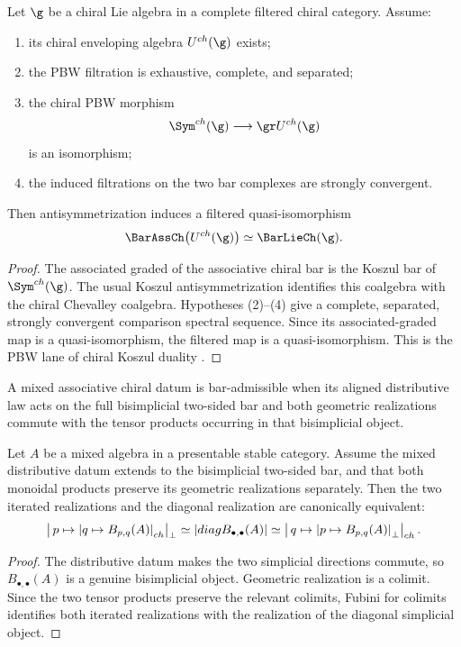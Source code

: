 \begin{theorem}
Let $\g$ be a chiral Lie algebra in a complete filtered chiral category.  Assume:
\begin{enumerate}
\item its chiral enveloping algebra $U^{\ch}(\g)$ exists;
\item the PBW filtration is exhaustive, complete, and separated;
\item the chiral PBW morphism
\[
 \Sym^{\ch}(\g)\longrightarrow \gr U^{\ch}(\g)
\]
is an isomorphism;
\item the induced filtrations on the two bar complexes are strongly convergent.
\end{enumerate}
Then antisymmetrization induces a filtered quasi-isomorphism
\[
 \BarAssCh\bigl(U^{\ch}(\g)\bigr)
 \simeq
 \BarLieCh(\g).
\]
\end{theorem}
\begin{proof}
The associated graded of the associative chiral bar is the Koszul bar of $\Sym^{\ch}(\g)$.  The usual Koszul antisymmetrization identifies this coalgebra with the chiral Chevalley coalgebra.  Hypotheses (2)--(4) give a complete, separated, strongly convergent comparison spectral sequence.  Since its associated-graded map is a quasi-isomorphism, the filtered map is a quasi-isomorphism.  This is the PBW lane of chiral Koszul duality \cite{BD04,FG12}.
\end{proof}

\begin{definition}
A mixed associative chiral datum is bar-admissible when its aligned distributive law acts on the full bisimplicial two-sided bar and both geometric realizations commute with the tensor products occurring in that bisimplicial object.
\end{definition}

\begin{theorem}
Let $A$ be a mixed algebra in a presentable stable category.  Assume the mixed distributive datum extends to the bisimplicial two-sided bar, and that both monoidal products preserve its geometric realizations separately.  Then the two iterated realizations and the diagonal realization are canonically equivalent:
\[
 \left|\,p\mapsto\left|q\mapsto B_{p,q}(A)\right|_{ch}\right|_\perp
 \simeq
 \left|diagB_{\bullet,\bullet}(A)\right|
 \simeq
 \left|\,q\mapsto\left|p\mapsto B_{p,q}(A)\right|_\perp\right|_{ch}.
\]
\end{theorem}
\begin{proof}
The distributive datum makes the two simplicial directions commute, so $B_{\bullet,\bullet}(A)$ is a genuine bisimplicial object.  Geometric realization is a colimit.  Since the two tensor products preserve the relevant colimits, Fubini for colimits identifies both iterated realizations with the realization of the diagonal simplicial object.
\end{proof}

